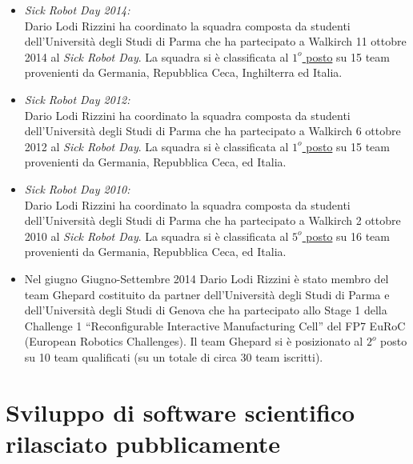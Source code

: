 \documentclass[11pt]{article}
\newcommand{\ITEMDATE}[1]{\item \textit{#1:}\\}
\begin{document}
\begin{itemize}
\begin{itemize}

\ITEMDATE{Sick Robot Day 2014}
Dario Lodi Rizzini ha coordinato la squadra composta da studenti dell'Universit\`a degli Studi di Parma
che ha partecipato a Walkirch 11 ottobre 2014 al \emph{Sick Robot Day}.
La squadra si \`e classificata al \underline{$1^o$ posto} su 15 team provenienti da Germania, Repubblica Ceca,
Inghilterra ed Italia. 

\ITEMDATE{Sick Robot Day 2012}
Dario Lodi Rizzini ha coordinato la squadra composta da studenti dell'Universit\`a degli Studi di Parma
che ha partecipato a Walkirch 6 ottobre 2012 al \emph{Sick Robot Day}.
La squadra si \`e classificata al \underline{$1^o$ posto} su 15 team provenienti da Germania, Repubblica Ceca,
ed Italia. 

\ITEMDATE{Sick Robot Day 2010}
Dario Lodi Rizzini ha coordinato la squadra composta da studenti dell'Universit\`a degli Studi di Parma
che ha partecipato a Walkirch 2 ottobre 2010 al \emph{Sick Robot Day}.
La squadra si \`e classificata al \underline{$5^o$ posto} su 16 team provenienti da Germania, Repubblica Ceca,
ed Italia. 

\end{itemize}

\begin{itemize}
\item Nel giugno Giugno-Settembre 2014 Dario Lodi Rizzini \`e stato membro del team Ghepard costituito da partner dell'Universit\`a degli Studi di Parma e dell'Universit\`a degli Studi di Genova che ha partecipato allo Stage 1 della Challenge 1 ``Reconfigurable Interactive Manufacturing Cell'' del FP7 EuRoC (European Robotics Challenges).
Il team Ghepard si \`e posizionato al $2^o$ posto su 10 team qualificati (su un totale di circa 30 team iscritti).
\end{itemize}



\section*{Sviluppo di software scientifico rilasciato pubblicamente}


\end{itemize}
\end{document}
